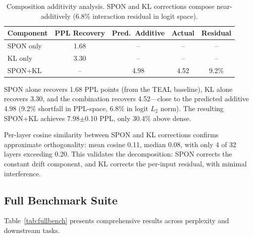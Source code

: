 \documentclass[11pt,a4paper]{article}
\begin{document}
\begin{table}[t]
\centering
\small
\caption{Composition additivity analysis. SPON and KL corrections compose near-additively (6.8\% interaction residual in logit space).}
\label{tab:composition}
\begin{tabular}{lcccc}
\toprule
\textbf{Component} & \textbf{PPL Recovery} & \textbf{Pred.\ Additive} & \textbf{Actual} & \textbf{Residual} \\
\midrule
SPON only & 1.68 & -- & -- & -- \\
KL only & 3.30 & -- & -- & -- \\
SPON+KL & -- & 4.98 & 4.52 & 9.2\% \\
\bottomrule
\end{tabular}
\end{table}

SPON alone recovers 1.68 PPL points (from the TEAL baseline), KL alone recovers 3.30, and the combination recovers 4.52---close to the predicted additive 4.98 (9.2\% shortfall in PPL-space, 6.8\% in logit $L_2$ norm).
The resulting SPON+KL achieves 7.98$\pm$0.10 PPL, only 30.4\% above dense.

Per-layer cosine similarity between SPON and KL corrections confirms approximate orthogonality: mean cosine 0.11, median 0.08, with only 4 of 32 layers exceeding 0.20.
This validates the decomposition: SPON corrects the constant drift component, and KL corrects the per-input residual, with minimal interference.

\subsection{Full Benchmark Suite}
\label{sec:fullbench}

Table~\ref{tab:fullbench} presents comprehensive results across perplexity and downstream tasks.
\end{document}
